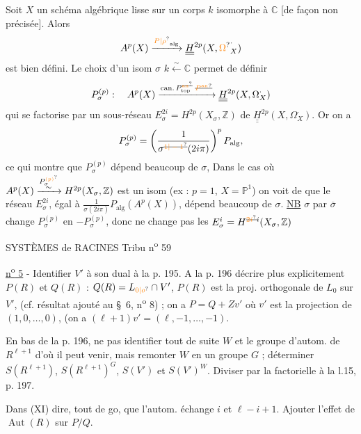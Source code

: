 Soit $X$ un schéma algébrique lisse sur  un corps $k$ isomorphe à $\mathbb C$ \unsure{(}[de façon non précisée]. Alors
\[
 A^p(X)\xrightarrow{\unsure{P|\rho}_{\mathrm{alg}}}
 \underline{\underline H}^{2p}(X,\unsure{\Omega}_X^{\cdot})
\]
est bien défini. Le choix d'un isom $\sigma$ $k\xleftarrow{\sim}\mathbb C$  permet de définir
\[
 P_\sigma^{(p)}:\quad
 A^p(X)\xrightarrow{\mathrm{can.}\,P^{\deleted{\unsure{\mathrm{an}}}}_{\mathrm{top}}\;\deleted{\unsure{P^{\mathrm{an}}}}}
 \underline{\underline H}^{2p}(X,\Omega_X^{\cdot})
\]
qui se factorise par un sous-réseau $E_\sigma^{2i}=H^{2p}(X_\sigma,\mathbb Z)$ de $\underline{\underline H}^{2p}(X,\Omega_X^{\cdot})$. Or on a
\[
 P_\sigma^{(p)}=\left(\frac{1}{\sigma^{\deleted{\unsure{1|-1}}}(2i\pi)}\right)^p P_{\mathrm{alg}},
\]
ce qui montre que $P_\sigma^{(p)}$ dépend beaucoup de $\sigma$,  Dans le cas où $A^p(X)\xrightarrow{\substack{P_\sigma^{\unsure{(p)}}\\\sim}}H^{2p}(X_\sigma,\mathbb Z)$ est un isom (ex : $p=1$, $X=\mathbb P^1$) on voit de  que le réseau $E_\sigma^{2i}$, égal à $\frac{1}{\sigma(2i\pi)}P_{\mathrm{alg}}(A^p(X))$, dépend beaucoup de $\sigma$. \uline{NB}  $\sigma$ par $\overline{\sigma}$ change $P_\sigma^{(p)}$ en $-P_\sigma^{(p)}$, donc ne change pas les $E_\sigma^i=H^{\deleted{\unsure{2i}}i}(X_\sigma,\mathbb Z)$

SYSTÈMES de RACINES \hfill Tribu n\textsuperscript{o} 59

\uline{n\textsuperscript{o} 5} - Identifier $V'$ à son dual à la p. 195. A la p. 196 décrire plus explicitement $P(R)$ et $Q(R)$ : $Q(R)=L_{\unsure{0|o}}\cap V'$, $P(R)$ est la proj. orthogonale de $L_0$ sur $V'$, (cf. résultat ajouté au \S~6, n\textsuperscript{o} 8) ; on a $P=Q+Zv'$ où $v'$ est la projection de $(1,0,\ldots,0)$, (on a $(\ell+1)v'=(\ell,-1,\ldots,-1)$.

En bas de la p. 196, ne pas identifier tout de suite $W$ et le groupe d'autom. de $R^{\ell+1}$ d'où il peut venir, mais remonter $W$ en un groupe $G$ ; déterminer $S(R^{\ell+1})$, $S(R^{\ell+1})^G$, $S(V')$ et $S(V')^W$. Diviser par la factorielle à la l.15, p. 197.

Dans (XI) dire, tout de go, que l'autom. échange $i$ et $\ell-i+1$. Ajouter l'effet de $\operatorname{Aut}(R)$ sur $P/Q$.

